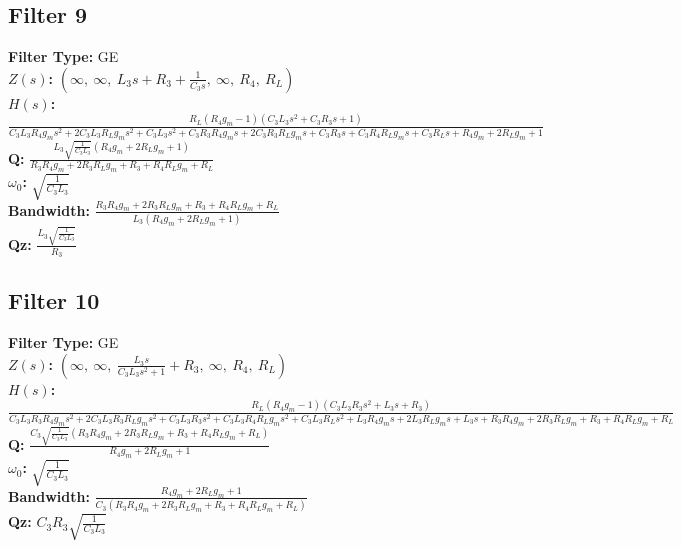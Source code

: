 \documentclass{article}
\begin{document}
\subsection*{Filter 9}
\textbf{Filter Type:} GE \\ 
\textbf{$Z(s)$:} $\left( \infty, \  \infty, \  L_{3} s + R_{3} + \frac{1}{C_{3} s}, \  \infty, \  R_{4}, \  R_{L}\right)$ \\ 
\textbf{$H(s)$:} $\frac{R_{L} \left(R_{4} g_{m} - 1\right) \left(C_{3} L_{3} s^{2} + C_{3} R_{3} s + 1\right)}{C_{3} L_{3} R_{4} g_{m} s^{2} + 2 C_{3} L_{3} R_{L} g_{m} s^{2} + C_{3} L_{3} s^{2} + C_{3} R_{3} R_{4} g_{m} s + 2 C_{3} R_{3} R_{L} g_{m} s + C_{3} R_{3} s + C_{3} R_{4} R_{L} g_{m} s + C_{3} R_{L} s + R_{4} g_{m} + 2 R_{L} g_{m} + 1}$ \\ 
\textbf{Q:} $\frac{L_{3} \sqrt{\frac{1}{C_{3} L_{3}}} \left(R_{4} g_{m} + 2 R_{L} g_{m} + 1\right)}{R_{3} R_{4} g_{m} + 2 R_{3} R_{L} g_{m} + R_{3} + R_{4} R_{L} g_{m} + R_{L}}$ \\ 
\textbf{$\omega_0$:} $\sqrt{\frac{1}{C_{3} L_{3}}}$ \\ 
\textbf{Bandwidth:} $\frac{R_{3} R_{4} g_{m} + 2 R_{3} R_{L} g_{m} + R_{3} + R_{4} R_{L} g_{m} + R_{L}}{L_{3} \left(R_{4} g_{m} + 2 R_{L} g_{m} + 1\right)}$ \\ 
\textbf{Qz:} $\frac{L_{3} \sqrt{\frac{1}{C_{3} L_{3}}}}{R_{3}}$ \\ 
\subsection*{Filter 10}
\textbf{Filter Type:} GE \\ 
\textbf{$Z(s)$:} $\left( \infty, \  \infty, \  \frac{L_{3} s}{C_{3} L_{3} s^{2} + 1} + R_{3}, \  \infty, \  R_{4}, \  R_{L}\right)$ \\ 
\textbf{$H(s)$:} $\frac{R_{L} \left(R_{4} g_{m} - 1\right) \left(C_{3} L_{3} R_{3} s^{2} + L_{3} s + R_{3}\right)}{C_{3} L_{3} R_{3} R_{4} g_{m} s^{2} + 2 C_{3} L_{3} R_{3} R_{L} g_{m} s^{2} + C_{3} L_{3} R_{3} s^{2} + C_{3} L_{3} R_{4} R_{L} g_{m} s^{2} + C_{3} L_{3} R_{L} s^{2} + L_{3} R_{4} g_{m} s + 2 L_{3} R_{L} g_{m} s + L_{3} s + R_{3} R_{4} g_{m} + 2 R_{3} R_{L} g_{m} + R_{3} + R_{4} R_{L} g_{m} + R_{L}}$ \\ 
\textbf{Q:} $\frac{C_{3} \sqrt{\frac{1}{C_{3} L_{3}}} \left(R_{3} R_{4} g_{m} + 2 R_{3} R_{L} g_{m} + R_{3} + R_{4} R_{L} g_{m} + R_{L}\right)}{R_{4} g_{m} + 2 R_{L} g_{m} + 1}$ \\ 
\textbf{$\omega_0$:} $\sqrt{\frac{1}{C_{3} L_{3}}}$ \\ 
\textbf{Bandwidth:} $\frac{R_{4} g_{m} + 2 R_{L} g_{m} + 1}{C_{3} \left(R_{3} R_{4} g_{m} + 2 R_{3} R_{L} g_{m} + R_{3} + R_{4} R_{L} g_{m} + R_{L}\right)}$ \\ 
\textbf{Qz:} $C_{3} R_{3} \sqrt{\frac{1}{C_{3} L_{3}}}$ \\ 
\end{document}
